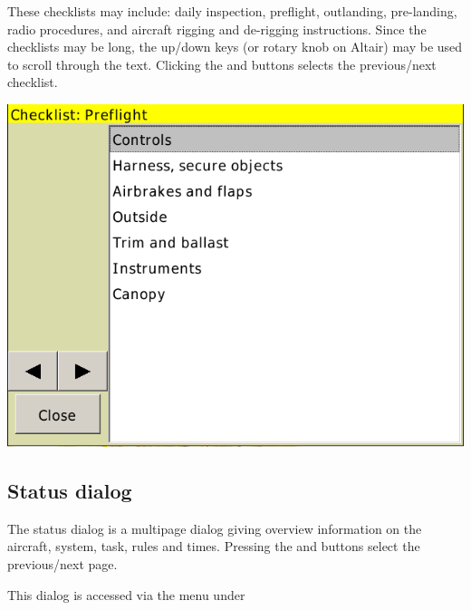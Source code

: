 \documentclass[a4paper,12pt]{refrep}
\begin{document}
These checklists may include: daily inspection, preflight, outlanding,
pre-landing, radio procedures, and aircraft rigging and de-rigging
instructions.  Since the checklists may be long, the up/down keys (or rotary
knob on Altair) may be used to scroll through the text. Clicking the
\button{$<$} and \button{$>$} buttons selects the previous/next checklist.

\begin{center}
\includegraphics[angle=0,width=0.8\linewidth,keepaspectratio='true']{figures/checklist.png}
\end{center}

\subsection*{Status dialog}
The status dialog is a multipage dialog giving overview information on the 
aircraft, system, task, rules and times. Pressing the \button{$<$} and
\button{$>$} buttons select the previous/next page.

This dialog is accessed via the menu under 
\begin{quote}
\blink{}
\end{quote}
\end{document}
